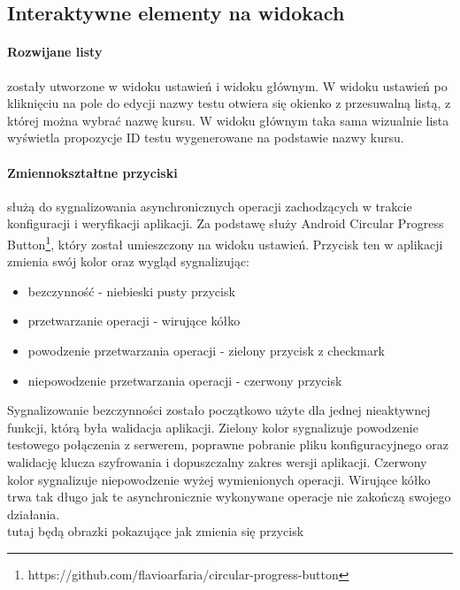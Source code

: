 \documentclass{report}
\begin{document}
			\subsection{Interaktywne elementy na widokach}
		
				\paragraph{Rozwijane listy}
				zostały utworzone w widoku ustawień i widoku głównym. W widoku ustawień po kliknięciu na pole do edycji nazwy testu otwiera się okienko z przesuwalną listą, z której można wybrać nazwę kursu. W widoku głównym taka sama wizualnie lista wyświetla propozycje ID testu wygenerowane na podstawie nazwy kursu.
		
				\paragraph{Zmiennokształtne przyciski}
				służą do sygnalizowania asynchronicznych operacji zachodzących w trakcie konfiguracji i weryfikacji aplikacji. Za podstawę służy Android Circular Progress Button\footnote{https://github.com/flavioarfaria/circular-progress-button}, który został umieszczony na widoku ustawień. Przycisk ten w aplikacji zmienia swój kolor oraz wygląd sygnalizując:
				\begin{itemize}
					\item bezczynność - niebieski pusty przycisk
					\item przetwarzanie operacji - wirujące kółko
					\item powodzenie przetwarzania operacji - zielony przycisk z checkmark
					\item niepowodzenie przetwarzania operacji - czerwony przycisk 
				\end{itemize}
				Sygnalizowanie bezczynności zostało początkowo użyte dla jednej nieaktywnej funkcji, którą była walidacja aplikacji. Zielony kolor sygnalizuje powodzenie testowego połączenia z serwerem, poprawne pobranie pliku konfiguracyjnego oraz walidację klucza szyfrowania i dopuszczalny zakres wersji aplikacji.
				Czerwony kolor sygnalizuje niepowodzenie wyżej wymienionych operacji.
				Wirujące kółko trwa tak długo jak te asynchronicznie wykonywane operacje nie zakończą swojego działania.\\
				
				tutaj będą obrazki pokazujące jak zmienia się przycisk\\
				
\end{document}
